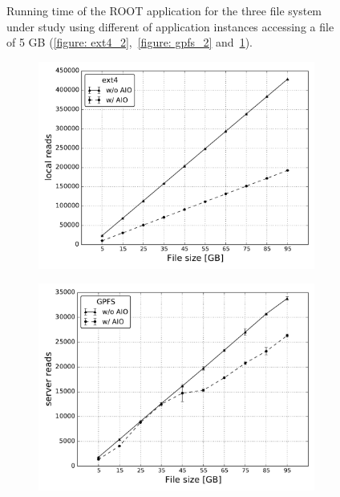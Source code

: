 \begin{figure}[]
\begin{subfigure}[]{0.70\textwidth}
    \caption{\textit{}}
    \label{figure: lustre_2}
  \end{subfigure}
  \caption{Running time of the ROOT application for the three file system under study using different of application instances accessing a file of 5 GB (\ref{figure: ext4_2},~\ref{figure: gpfs_2} and~\ref{figure: lustre_2}).}
  \label{figure: run-time_2}
\end{figure}

\begin{figure}[]
  \centering
  \begin{subfigure}[]{0.70\textwidth}
    \centering
    \includegraphics[width=\textwidth]{figures/ext4/reads}
    \caption{\textit{}}
    \label{figure: ext4_3}
  \end{subfigure}
  \begin{subfigure}[]{0.70\textwidth}
    \centering
    \includegraphics[width=\textwidth]{figures/gpfs/server_reads}

\end{subfigure}
\end{figure}
